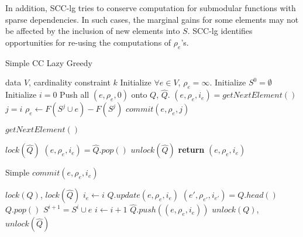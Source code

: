\documentclass{article}
\newcommand{\scclz}{SCC-lg}
\begin{document}
In addition, \scclz{} tries to conserve computation for submodular functions with sparse dependencies.
In such cases, the marginal gains for some elements may not be affected by the inclusion of new elements into $S$.
\scclz{} identifies opportunities for re-using the computations of $\rho_e$'s.
\begin{algorithm}[tb]
  \caption{Simple CC Lazy Greedy}
  \label{alg:scclz}
\begin{algorithmic}[1]
   data $V$, cardinality constraint $k$
  \STATE Initialize $\forall e \in V$, $\rho_e = \infty$.
  \STATE Initialize $S^0 = \emptyset$
  \STATE Initialize $i = 0$
  \STATE Push all $(e, \rho_e, 0)$ onto $Q$, $\widehat{Q}$.
      \STATE $(e, \rho_e, i_e) = getNextElement()$
      \STATE $j = i$
        \STATE $\rho_e     \leftarrow F(S^j \cup e) - F(S^j)$
      \ENDIF
      \STATE $commit(e, \rho_e, j)$
    \ENDWHILE
  \ENDFOR
\end{algorithmic}
\end{algorithm}

\begin{algorithm}[tb]
  \caption{$getNextElement()$}
  \label{alg:scclz:getnext}
\begin{algorithmic}
  \STATE $lock(\widehat{Q})$
  \STATE $(e, \rho_e, i_e) = \widehat{Q}.pop()$
  \STATE $unlock(\widehat{Q})$
  \STATE \textbf{return} $(e, \rho_e, i_e)$
\end{algorithmic}
\end{algorithm}


\begin{algorithm}[tb]
  \caption{Simple $commit(e, \rho_e, i_e)$}
  \label{alg:scclz:commit}
\begin{algorithmic}
  \STATE $lock(Q)$, $lock(\widehat{Q})$
    \STATE $i_e \leftarrow i$
  \ENDIF
  \STATE $Q.update(e, \rho_e, i_e)$
  \STATE $(e', \rho_{e'}, i_{e'}) = Q.head()$
    \STATE $Q.pop()$
    \STATE $S^{i+1} = S^i \cup e$
    \STATE $i \leftarrow i + 1$
  \ELSE
    \STATE $\widehat{Q}.push((e, \rho_e, i_e))$
  \ENDIF
  \STATE $unlock(Q)$, $unlock(\widehat{Q})$
\end{algorithmic}
\end{algorithm}
\end{document}
